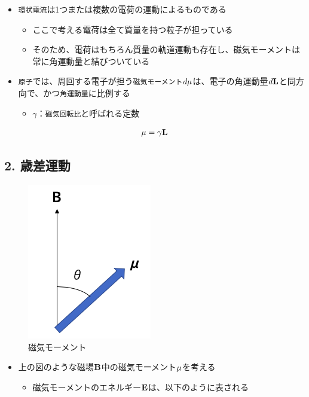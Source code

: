 \documentclass[11pt]{article}
\makeatletter
\def\maxwidth{\ifdim\Gin@nat@width>\linewidth\linewidth
    \else\Gin@nat@width\fi}
\let\Oldincludegraphics\includegraphics
\renewcommand{\includegraphics}[1]{\Oldincludegraphics[width=.8\maxwidth]{#1}}
\providecommand{\tightlist}{%
      \setlength{\itemsep}{0pt}\setlength{\parskip}{0pt}}
\makeatother
\begin{document}
\begin{itemize}
\item
  \texttt{環状電流}は1つまたは複数の電荷の運動によるものである

  \begin{itemize}
  \item
    ここで考える電荷は全て質量を持つ粒子が担っている
  \item
    そのため、電荷はもちろん質量の軌道運動も存在し、磁気モーメントは常に角運動量と結びついている
  \end{itemize}
\item
  \texttt{原子}では、周回する電子が担う\texttt{磁気モーメント}\(d{\bf \mu}\)は、電子の角運動量\(d{\bf L}\)と同方向で、かつ\texttt{角運動量}に比例する

  \begin{itemize}
  \tightlist
  \item
    \(\gamma\)：\texttt{磁気回転比}と呼ばれる定数
  \end{itemize}
\end{itemize}

\begin{eqnarray}
\bf \mu =\gamma{\bf L}
\end{eqnarray}

    \subsection{2. 歳差運動}\label{ux6b73ux5deeux904bux52d5}

\begin{figure}
\centering
\includegraphics{./images/磁気モーメント.png}
\caption{磁気モーメント}
\end{figure}

\begin{itemize}
\item
  上の図のような磁場\({\bf B}\)中の磁気モーメント\({\bf \mu}\)を考える

  \begin{itemize}
  \tightlist
  \item
    磁気モーメントのエネルギー\({\bf E}\)は、以下のように表される
  \end{itemize}
\end{itemize}
\end{document}
